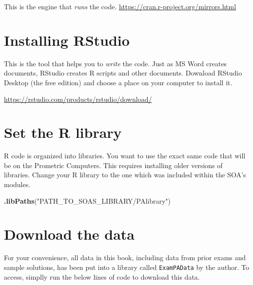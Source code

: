 \documentclass[]{book}
\newenvironment{Shaded}{\begin{snugshade}}{\end{snugshade}}
\newcommand{\CommentTok}[1]{\textcolor[rgb]{0.56,0.35,0.01}{\textit{#1}}}
\newcommand{\ControlFlowTok}[1]{\textcolor[rgb]{0.13,0.29,0.53}{\textbf{#1}}}
\newcommand{\KeywordTok}[1]{\textcolor[rgb]{0.13,0.29,0.53}{\textbf{#1}}}
\newcommand{\NormalTok}[1]{#1}
\newcommand{\OperatorTok}[1]{\textcolor[rgb]{0.81,0.36,0.00}{\textbf{#1}}}
\newcommand{\StringTok}[1]{\textcolor[rgb]{0.31,0.60,0.02}{#1}}
\begin{document}
This is the engine that \emph{runs} the code. \url{https://cran.r-project.org/mirrors.html}

\hypertarget{installing-rstudio}{%
\section{Installing RStudio}\label{installing-rstudio}}

This is the tool that helps you to \emph{write} the code. Just as MS Word creates documents, RStudio creates R scripts and other documents. Download RStudio Desktop (the free edition) and choose a place on your computer to install it.

\url{https://rstudio.com/products/rstudio/download/}

\hypertarget{set-the-r-library}{%
\section{Set the R library}\label{set-the-r-library}}

R code is organized into libraries. You want to use the exact same code that will be on the Prometric Computers. This requires installing older versions of libraries. Change your R library to the one which was included within the SOA's modules.

\begin{Shaded}
\begin{Highlighting}[]
\KeywordTok{.libPaths}\NormalTok{(}\StringTok{"PATH_TO_SOAS_LIBRARY/PAlibrary"}\NormalTok{)}
\end{Highlighting}
\end{Shaded}

\hypertarget{download-the-data}{%
\section{Download the data}\label{download-the-data}}

For your convenience, all data in this book, including data from prior exams and sample solutions, has been put into a library called \texttt{ExamPAData} by the author. To access, simplly run the below lines of code to download this data.

\begin{Shaded}
\end{Shaded}
\end{document}
